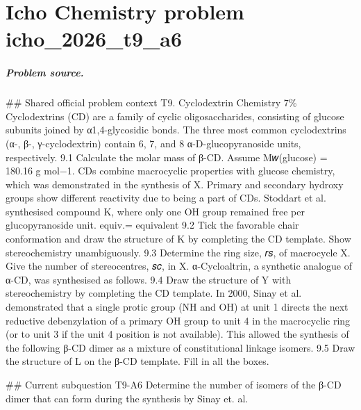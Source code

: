 
\chapter{Icho Chemistry problem icho\_2026\_t9\_a6}
\label{ch:IChO2026Problems_problem_icho_2026_t9_a6}

\paragraph{Problem source.}
\#\# Shared official problem context
T9. Cyclodextrin Chemistry 7\% Cyclodextrins (CD) are a family of cyclic oligosaccharides, consisting of glucose subunits joined by α1,4-glycosidic bonds. The three most common cyclodextrins (α-, β-, γ-cyclodextrin) contain 6, 7, and 8 α-D-glucopyranoside units, respectively. 9.1 Calculate the molar mass of β-CD. Assume M𝑤(glucose) = 180.16 g mol−1. CDs combine macrocyclic properties with glucose chemistry, which was demonstrated in the synthesis of X. Primary and secondary hydroxy groups show different reactivity due to being a part of CDs. Stoddart et al. synthesised compound K, where only one OH group remained free per glucopyranoside unit. equiv.= equivalent 9.2 Tick the favorable chair conformation and draw the structure of K by completing the CD template. Show stereochemistry unambiguously. 9.3 Determine the ring size, 𝑟𝑠, of macrocycle X. Give the number of stereocentres, 𝑠𝑐, in X. α-Cycloaltrin, a synthetic analogue of α-CD, was synthesised as follows. 9.4 Draw the structure of Y with stereochemistry by completing the CD template. In 2000, Sinay et al. demonstrated that a single protic group (NH and OH) at unit 1 directs the next reductive debenzylation of a primary OH group to unit 4 in the macrocyclic ring (or to unit 3 if the unit 4 position is not available). This allowed the synthesis of the following β-CD dimer as a mixture of constitutional linkage isomers. 9.5 Draw the structure of L on the β-CD template. Fill in all the boxes.

\#\# Current subquestion T9-A6
Determine the number of isomers of the β-CD dimer that can form during the synthesis by Sinay et. al.

